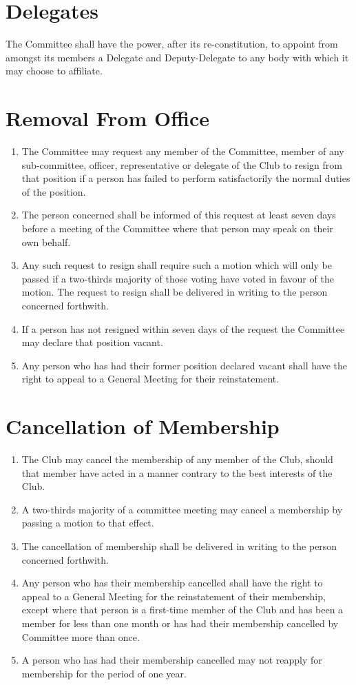 \documentclass[11pt]{article} %
\begin{document}
\section{Delegates}
The Committee shall have the power, after its re-constitution, to appoint from amongst its members a Delegate and Deputy-Delegate to any body with which it may choose to affiliate.

\section{Removal From Office}
\begin{enumerate}
	\item The Committee may request any member of the Committee, member of any sub-committee, officer, representative or delegate of the Club to resign from that position if a person has failed to perform satisfactorily the normal duties of the position.
	\item The person concerned shall be informed of this request at least seven days before a meeting of the Committee where that person may speak on their own behalf.
	\item Any such request to resign shall require such a motion which will only be passed if a two-thirds majority of those voting have voted in favour of the motion. The request to resign shall be delivered in writing to the person concerned forthwith.
	\item If a person has not resigned within seven days of the request the Committee may declare that position vacant.
	\item Any person who has had their former position declared vacant shall have the right to appeal to a General Meeting for their reinstatement.
\end{enumerate}

\section{Cancellation of Membership}
\begin{enumerate}
\item The Club may cancel the membership of any member of the Club, should that member have acted in a manner contrary to the best interests of the Club.
\item A two-thirds majority of a committee meeting may cancel a membership by passing a motion to that effect.
\item The cancellation of membership shall be delivered in writing to the person concerned forthwith.
\item Any person who has their membership cancelled shall have the right to appeal to a General Meeting for the reinstatement of their membership, except where that person is a first-time member of the Club and has been a member for less than one month or has had their membership cancelled by Committee more than once.
\item A person who has had their membership cancelled may not reapply for membership for the period of one year.
\end{enumerate}
\end{document}
